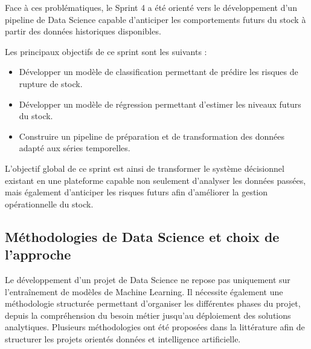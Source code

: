 Face à ces problématiques, le Sprint 4 a été orienté vers le développement d'un pipeline de Data Science capable d'anticiper les comportements futurs du stock à partir des données historiques disponibles.
 
Les principaux objectifs de ce sprint sont les suivants :
 
\begin{itemize}
    \item Développer un modèle de classification permettant de prédire les risques de rupture de stock.
    \item Développer un modèle de régression permettant d'estimer les niveaux futurs du stock.
    \item Construire un pipeline de préparation et de transformation des données adapté aux séries temporelles.
\end{itemize}
 
L'objectif global de ce sprint est ainsi de transformer le système décisionnel existant en une plateforme capable non seulement d'analyser les données passées, mais également d'anticiper les risques futurs afin d'améliorer la gestion opérationnelle du stock.
 
\begin{table}[H]
\centering
\caption{Sprint 4 : Pipeline Data Science : Prévision de stock}
\label{tab:ch4:sprint4}
\end{table}
 
\subsection{Méthodologies de Data Science et choix de l'approche}
 
Le développement d'un projet de Data Science ne repose pas uniquement sur l'entraînement de modèles de Machine Learning. Il nécessite également une méthodologie structurée permettant d'organiser les différentes phases du projet, depuis la compréhension du besoin métier jusqu'au déploiement des solutions analytiques. Plusieurs méthodologies ont été proposées dans la littérature afin de structurer les projets orientés données et intelligence artificielle.
 
